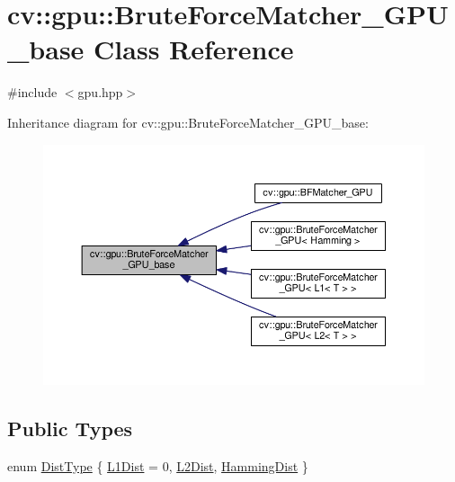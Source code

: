 \hypertarget{classcv_1_1gpu_1_1BruteForceMatcher__GPU__base}{\section{cv\-:\-:gpu\-:\-:Brute\-Force\-Matcher\-\_\-\-G\-P\-U\-\_\-base Class Reference}
\label{classcv_1_1gpu_1_1BruteForceMatcher__GPU__base}
}


{\ttfamily \#include $<$gpu.\-hpp$>$}



Inheritance diagram for cv\-:\-:gpu\-:\-:Brute\-Force\-Matcher\-\_\-\-G\-P\-U\-\_\-base\-:\nopagebreak
\begin{figure}[H]
\begin{center}
\leavevmode
\includegraphics[width=350pt]{classcv_1_1gpu_1_1BruteForceMatcher__GPU__base__inherit__graph}
\end{center}
\end{figure}
\subsection*{Public Types}
\begin{DoxyCompactItemize}
\item 
enum \hyperlink{classcv_1_1gpu_1_1BruteForceMatcher__GPU__base_aed33fcc2dc26fe578648b63d1726b825}{Dist\-Type} \{ \hyperlink{classcv_1_1gpu_1_1BruteForceMatcher__GPU__base_aed33fcc2dc26fe578648b63d1726b825aa93171fa5f8b55702f03e82d1a87980f}{L1\-Dist} = 0, 
\hyperlink{classcv_1_1gpu_1_1BruteForceMatcher__GPU__base_aed33fcc2dc26fe578648b63d1726b825a3a3b09b7d87b4c338bff7807249a14cd}{L2\-Dist}, 
\hyperlink{classcv_1_1gpu_1_1BruteForceMatcher__GPU__base_aed33fcc2dc26fe578648b63d1726b825a6009d1af7f9c424ab7518a8724dbe3ad}{Hamming\-Dist}
 \}
\end{DoxyCompactItemize}
